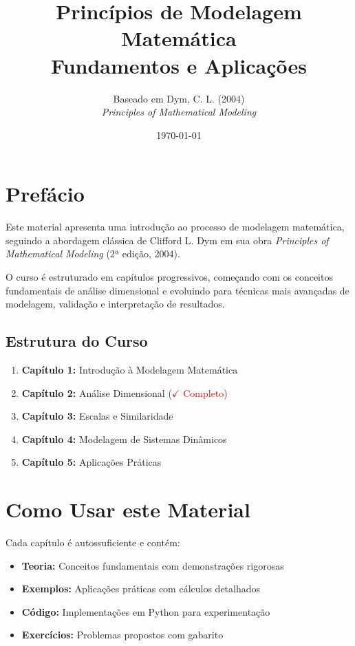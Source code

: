 \documentclass[12pt,a4paper,oneside]{book}
\title{\textbf{Princípios de Modelagem Matemática} \\[1cm]
        \Large Fundamentos e Aplicações}
\author{Baseado em Dym, C. L. (2004) \\
        \textit{Principles of Mathematical Modeling}}
\date{\today}
\begin{document}
\maketitle

\frontmatter

\chapter*{Prefácio}

Este material apresenta uma introdução ao processo de modelagem matemática,
seguindo a abordagem clássica de Clifford L. Dym em sua obra
\textit{Principles of Mathematical Modeling} (2ª edição, 2004).

O curso é estruturado em capítulos progressivos, começando com os conceitos
fundamentais de análise dimensional e evoluindo para técnicas mais avançadas
de modelagem, validação e interpretação de resultados.

\section*{Estrutura do Curso}

\begin{enumerate}
    \item \textbf{Capítulo 1:} Introdução à Modelagem Matemática
    \item \textbf{Capítulo 2:} Análise Dimensional (\textcolor{red}{$\checkmark$ Completo})
    \item \textbf{Capítulo 3:} Escalas e Similaridade
    \item \textbf{Capítulo 4:} Modelagem de Sistemas Dinâmicos
    \item \textbf{Capítulo 5:} Aplicações Práticas
\end{enumerate}

\chapter*{Como Usar este Material}

Cada capítulo é autossuficiente e contém:

\begin{itemize}
    \item \textbf{Teoria:} Conceitos fundamentais com demonstrações rigorosas
    \item \textbf{Exemplos:} Aplicações práticas com cálculos detalhados
    \item \textbf{Código:} Implementações em Python para experimentação
    \item \textbf{Exercícios:} Problemas propostos com gabarito
\end{itemize}
\end{document}

